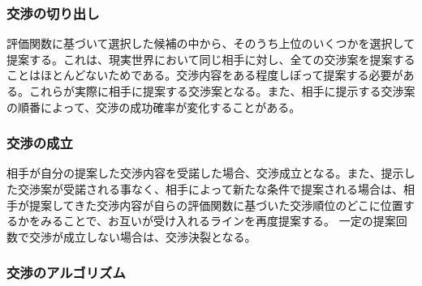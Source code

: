 \documentclass[a4, 10pt,dvipdfmx]{jsarticle}
\begin{document}
\subsubsection*{交渉の切り出し}
評価関数に基づいて選択した候補の中から、そのうち上位のいくつかを選択して提案する。これは、現実世界において同じ相手に対し、全ての交渉案を提案することはほとんどないためである。交渉内容をある程度しぼって提案する必要がある。これらが実際に相手に提案する交渉案となる。また、相手に提示する交渉案の順番によって、交渉の成功確率が変化することがある。

\subsubsection*{交渉の成立}
相手が自分の提案した交渉内容を受諾した場合、交渉成立となる。また、提示した交渉案が受諾される事なく、相手によって新たな条件で提案される場合は、相手が提案してきた交渉内容が自らの評価関数に基づいた交渉順位のどこに位置するかをみることで、お互いが受け入れるラインを再度提案する。
一定の提案回数で交渉が成立しない場合は、交渉決裂となる。

\subsubsection{交渉のアルゴリズム}







\end{document}
